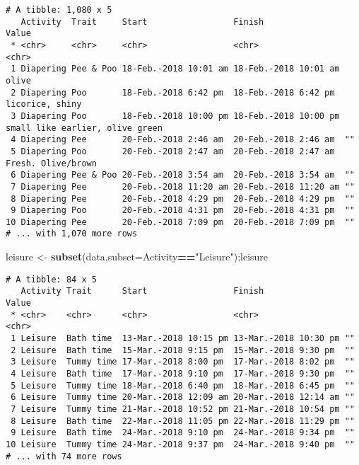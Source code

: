 \documentclass[10,portrait]{article}
\newenvironment{Shaded}{\begin{snugshade}}{\end{snugshade}}
\newcommand{\KeywordTok}[1]{\textcolor[rgb]{0.13,0.29,0.53}{\textbf{#1}}}
\newcommand{\DataTypeTok}[1]{\textcolor[rgb]{0.13,0.29,0.53}{#1}}
\newcommand{\StringTok}[1]{\textcolor[rgb]{0.31,0.60,0.02}{#1}}
\newcommand{\OperatorTok}[1]{\textcolor[rgb]{0.81,0.36,0.00}{\textbf{#1}}}
\newcommand{\NormalTok}[1]{#1}
\begin{document}
\begin{verbatim}
# A tibble: 1,080 x 5
   Activity  Trait     Start                 Finish                Value                          
 * <chr>     <chr>     <chr>                 <chr>                 <chr>                          
 1 Diapering Pee & Poo 18-Feb.-2018 10:01 am 18-Feb.-2018 10:01 am olive                          
 2 Diapering Poo       18-Feb.-2018 6:42 pm  18-Feb.-2018 6:42 pm  licorice, shiny                
 3 Diapering Poo       18-Feb.-2018 10:00 pm 18-Feb.-2018 10:00 pm small like earlier, olive green
 4 Diapering Pee       20-Feb.-2018 2:46 am  20-Feb.-2018 2:46 am  ""                             
 5 Diapering Poo       20-Feb.-2018 2:47 am  20-Feb.-2018 2:47 am  Fresh. Olive/brown             
 6 Diapering Pee & Poo 20-Feb.-2018 3:54 am  20-Feb.-2018 3:54 am  ""                             
 7 Diapering Pee       20-Feb.-2018 11:20 am 20-Feb.-2018 11:20 am ""                             
 8 Diapering Pee       20-Feb.-2018 4:29 pm  20-Feb.-2018 4:29 pm  ""                             
 9 Diapering Poo       20-Feb.-2018 4:31 pm  20-Feb.-2018 4:31 pm  ""                             
10 Diapering Pee       20-Feb.-2018 7:09 pm  20-Feb.-2018 7:09 pm  ""                             
# ... with 1,070 more rows
\end{verbatim}

\begin{Shaded}
\begin{Highlighting}[]
\NormalTok{leisure <-}\StringTok{ }\KeywordTok{subset}\NormalTok{(data,}\DataTypeTok{subset=}\NormalTok{Activity}\OperatorTok{==}\StringTok{"Leisure"}\NormalTok{);leisure}
\end{Highlighting}
\end{Shaded}

\begin{verbatim}
# A tibble: 84 x 5
   Activity Trait      Start                 Finish                Value
 * <chr>    <chr>      <chr>                 <chr>                 <chr>
 1 Leisure  Bath time  13-Mar.-2018 10:15 pm 13-Mar.-2018 10:30 pm ""   
 2 Leisure  Bath time  15-Mar.-2018 9:15 pm  15-Mar.-2018 9:30 pm  ""   
 3 Leisure  Tummy time 17-Mar.-2018 8:00 pm  17-Mar.-2018 8:02 pm  ""   
 4 Leisure  Bath time  17-Mar.-2018 9:10 pm  17-Mar.-2018 9:30 pm  ""   
 5 Leisure  Tummy time 18-Mar.-2018 6:40 pm  18-Mar.-2018 6:45 pm  ""   
 6 Leisure  Tummy time 20-Mar.-2018 12:09 am 20-Mar.-2018 12:14 am ""   
 7 Leisure  Tummy time 21-Mar.-2018 10:52 pm 21-Mar.-2018 10:54 pm ""   
 8 Leisure  Bath time  22-Mar.-2018 11:05 pm 22-Mar.-2018 11:29 pm ""   
 9 Leisure  Bath time  24-Mar.-2018 9:10 pm  24-Mar.-2018 9:34 pm  ""   
10 Leisure  Tummy time 24-Mar.-2018 9:37 pm  24-Mar.-2018 9:40 pm  ""   
# ... with 74 more rows
\end{verbatim}
\end{document}
